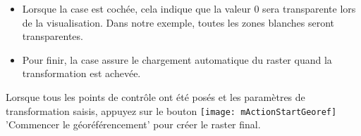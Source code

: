 \begin{itemize}[label=--]
\item  Lorsque la case  est cochée, cela indique que la valeur 0 sera transparente lors de la visualisation. Dans notre exemple, toutes les zones blanches seront transparentes.
\item Pour finir, la case  assure le chargement automatique du raster quand la transformation est achevée.
\end{itemize}

\label{georeferencer_running}

Lorsque tous les points de contrôle ont été posés et les paramètres de transformation saisis, appuyez sur le bouton \texttt{[image: mActionStartGeoref]} 'Commencer le géoréférencement' pour créer le raster final.

